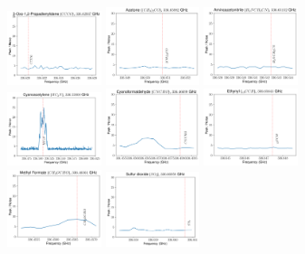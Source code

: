 \documentclass[12pt]{article}
\begin{document}
\begin{figure}
\includegraphics[width=0.245\textwidth]{spw1_CCCO}
\includegraphics[width=0.245\textwidth]{spw1_(CH3)2CO}
\includegraphics[width=0.245\textwidth]{spw1_H2NCH2CN}
\includegraphics[width=0.245\textwidth]{spw1_HC3N}
\includegraphics[width=0.245\textwidth]{spw1_CNCHO}
\includegraphics[width=0.245\textwidth]{spw1_13CCH}
\includegraphics[width=0.245\textwidth]{spw1_CH3OCHO}
\includegraphics[width=0.245\textwidth]{spw1_SO2}
\end{figure}
\end{document}
